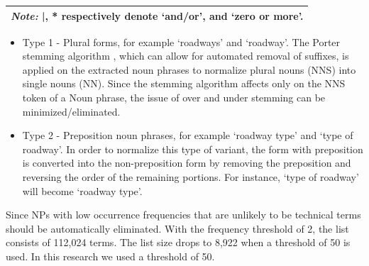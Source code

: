 \documentclass[Journal,InsideFigs, DoubleSpace]{ascelike} %
\begin{document}
\begin{enumerate} [label=\roman*]
\begin{table} [t]
\begin{tabular}{l l}
			\hline
			\multicolumn{2}{l}{\textit{Note:} |, * respectively denote `and/or', and `zero or more'.  } \\
			\hline
		\end{tabular}
		\normalsize
	\end{table}
	\begin{itemize}
		\item Type 1 - Plural forms, for example `roadways' and `roadway'. The Porter stemming algorithm \cite{porter80}, which can allow for automated removal of suffixes, is applied on the extracted noun phrases to normalize plural nouns (NNS) into single nouns (NN). Since the stemming algorithm affects only on the NNS token of a Noun phrase, the issue of over and under stemming can be minimized/eliminated. %
		\item Type 2 - Preposition noun phrases, for example `roadway type' and `type of roadway'. In order to normalize this type of variant, the form with preposition is converted into the non-preposition form by removing the preposition and reversing the order of the remaining portions. For instance, `type of roadway' will become `roadway type'.
	\end{itemize}
	Since NPs with low occurrence frequencies that are unlikely to be technical terms should be automatically eliminated. With the frequency threshold of 2, the list consists of 112,024  terms. The list size drops to 8,922 when a threshold of 50 is used. In this research we used a threshold of 50.
\end{enumerate}
	
\end{document}

